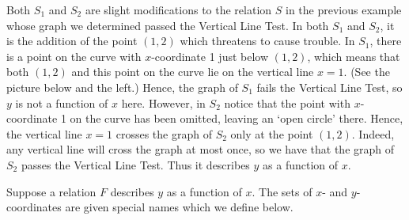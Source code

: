 \medskip

{
Both $S_{1}$ and $S_{2}$ are slight modifications to the relation $S$ in the previous example whose graph we determined passed the Vertical Line Test.  In both $S_{1}$ and $S_{2}$, it is the addition of the point $(1,2)$ which threatens to cause trouble.  In $S_{1}$, there is a point on the curve with $x$-coordinate 1 just below $(1,2)$, which means that both $(1,2)$ and this point on the curve lie on the vertical line $x=1$.  (See the picture below and the left.)  Hence, the graph of  $S_{1}$ fails the Vertical Line Test, so $y$ is not a function of $x$ here.  However, in $S_{2}$ notice that the point with $x$-coordinate 1 on the curve has been omitted, leaving an `open circle' there.  Hence, the vertical line $x=1$ crosses the graph of $S_{2}$ only at the point $(1,2)$.  Indeed, any vertical line will cross the graph at most once, so we have that the graph of $S_{2}$ passes the Vertical Line Test.  Thus it describes $y$ as a function of $x$.
}


\medskip

Suppose a relation $F$ describes $y$ as a function of $x$.  The sets of $x$- and $y$-coordinates are given special names which we define below.

\smallskip


